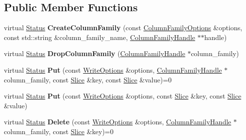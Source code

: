 \subsection*{Public Member Functions}
\begin{DoxyCompactItemize}
\item 
virtual \hyperlink{classrocksdb_1_1Status}{Status} {\bfseries Create\+Column\+Family} (const \hyperlink{structrocksdb_1_1ColumnFamilyOptions}{Column\+Family\+Options} \&options, const std\+::string \&column\+\_\+family\+\_\+name, \hyperlink{classrocksdb_1_1ColumnFamilyHandle}{Column\+Family\+Handle} $\ast$$\ast$handle)\hypertarget{classrocksdb_1_1DB_ab6f4cf8a955b0083fde139a70104753b}{}\label{classrocksdb_1_1DB_ab6f4cf8a955b0083fde139a70104753b}

\item 
virtual \hyperlink{classrocksdb_1_1Status}{Status} {\bfseries Drop\+Column\+Family} (\hyperlink{classrocksdb_1_1ColumnFamilyHandle}{Column\+Family\+Handle} $\ast$column\+\_\+family)\hypertarget{classrocksdb_1_1DB_af08fcb7b5334227e118e79a591b92408}{}\label{classrocksdb_1_1DB_af08fcb7b5334227e118e79a591b92408}

\item 
virtual \hyperlink{classrocksdb_1_1Status}{Status} {\bfseries Put} (const \hyperlink{structrocksdb_1_1WriteOptions}{Write\+Options} \&options, \hyperlink{classrocksdb_1_1ColumnFamilyHandle}{Column\+Family\+Handle} $\ast$column\+\_\+family, const \hyperlink{classrocksdb_1_1Slice}{Slice} \&key, const \hyperlink{classrocksdb_1_1Slice}{Slice} \&value)=0\hypertarget{classrocksdb_1_1DB_ab1731d9fde21f163083bef66454432e2}{}\label{classrocksdb_1_1DB_ab1731d9fde21f163083bef66454432e2}

\item 
virtual \hyperlink{classrocksdb_1_1Status}{Status} {\bfseries Put} (const \hyperlink{structrocksdb_1_1WriteOptions}{Write\+Options} \&options, const \hyperlink{classrocksdb_1_1Slice}{Slice} \&key, const \hyperlink{classrocksdb_1_1Slice}{Slice} \&value)\hypertarget{classrocksdb_1_1DB_a998d342c4a74b56a53e70e27c87eb2db}{}\label{classrocksdb_1_1DB_a998d342c4a74b56a53e70e27c87eb2db}

\item 
virtual \hyperlink{classrocksdb_1_1Status}{Status} {\bfseries Delete} (const \hyperlink{structrocksdb_1_1WriteOptions}{Write\+Options} \&options, \hyperlink{classrocksdb_1_1ColumnFamilyHandle}{Column\+Family\+Handle} $\ast$column\+\_\+family, const \hyperlink{classrocksdb_1_1Slice}{Slice} \&key)=0\hypertarget{classrocksdb_1_1DB_a50336757940b8c37bcf91857f11b6ad1}{}\label{classrocksdb_1_1DB_a50336757940b8c37bcf91857f11b6ad1}


\end{DoxyCompactItemize}
